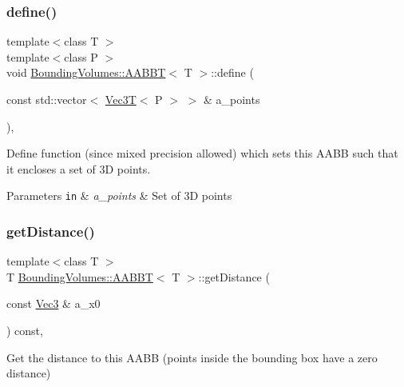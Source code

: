 \subsubsection{\texorpdfstring{define()}{define()}}
{\footnotesize\ttfamily template$<$class T $>$ \\
template$<$class P $>$ \\
void \hyperlink{classBoundingVolumes_1_1AABBT}{Bounding\+Volumes\+::\+A\+A\+B\+BT}$<$ T $>$\+::define (\begin{DoxyParamCaption}\item[{const std\+::vector$<$ \hyperlink{classVec3T}{Vec3T}$<$ P $>$ $>$ \&}]{a\+\_\+points }\end{DoxyParamCaption})\hspace{0.3cm}{\ttfamily [inline]}, {\ttfamily [noexcept]}}



Define function (since mixed precision allowed) which sets this A\+A\+BB such that it encloses a set of 3D points. 


\begin{DoxyParams}[1]{Parameters}
\mbox{\tt in}  & {\em a\+\_\+points} & Set of 3D points \\
\hline
\end{DoxyParams}
\mbox{\label{classBoundingVolumes_1_1AABBT_ad883975a0926c0755a978283137f378f}} 
\subsubsection{\texorpdfstring{get\+Distance()}{getDistance()}}
{\footnotesize\ttfamily template$<$class T $>$ \\
T \hyperlink{classBoundingVolumes_1_1AABBT}{Bounding\+Volumes\+::\+A\+A\+B\+BT}$<$ T $>$\+::get\+Distance (\begin{DoxyParamCaption}\item[{const \hyperlink{classBoundingVolumes_1_1AABBT_aa968c6b21a7f02e1cbfc03d26c7e67b4}{Vec3} \&}]{a\+\_\+x0 }\end{DoxyParamCaption}) const\hspace{0.3cm}{\ttfamily [inline]}, {\ttfamily [noexcept]}}



Get the distance to this A\+A\+BB (points inside the bounding box have a zero distance) 


